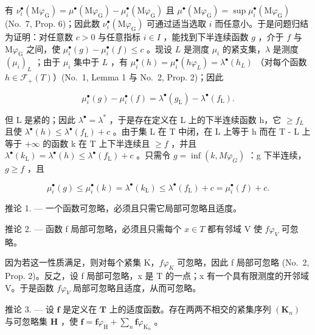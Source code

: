 有 \(\nu_{i}^{\bullet}(\mathrm{M}\varphi_{\mathrm{G}}) = \mu^{\bullet}(\mathrm{M}\varphi_{\mathrm{G}}) - \mu_{i}^{\bullet}(\mathrm{M}\varphi_{\mathrm{G}})\) 且 \(\mu^{\bullet}(\mathrm{M}\varphi_{\mathrm{G}}) = \sup \mu_{i}^{\bullet}(\mathrm{M}\varphi_{\mathrm{G}})\) (No.~7, Prop. 6)；因此数 \(\nu_{i}^{\bullet}(\mathrm{M}\varphi_{\mathrm{G}})\) 可通过适当选取 \(i\) 而任意小。于是问题归结为证明：对任意数 \(c > 0\) 与任意指标 \(i \in I\) ，能找到下半连续函数 \(g\) ，介于 \(f\) 与 \(\mathrm{M}\varphi_{\mathrm{G}}\) 之间，使 \(\mu_{i}^{\bullet}(g) - \mu_{i}^{\bullet}(f) \leqslant c\) 。现设 \(L\) 是测度 \(\mu_{i}\) 的紧支集，\(\lambda\) 是测度 \((\mu_{i})_{L}\) ；由于 \(\mu_{i}\) 集中于 \(L\) ，有 \(\mu_{i}^{\bullet}(h) = \mu_{i}^{\bullet}(h\varphi_{L}) = \lambda^{\bullet}(h_{L})\) （对每个函数 \(h \in \mathcal{F}_{+}(T)\)）(No.~1, Lemma 1 与 No.~2, Prop. 2)；因此

\[
\mu_ {i} ^ {\bullet} (g) - \mu_ {i} ^ {\bullet} (f) = \lambda^ {\bullet} (g _ {\mathrm{L}}) - \lambda^ {\bullet} (f _ {\mathrm{L}}).
\]

但 L 是紧的；因此 \(\lambda^{\bullet} = \lambda^{*}\) ，于是存在定义在 L 上的下半连续函数 h，它 \(\geqslant f_{L}\) 且使 \(\lambda^{\bullet}(h) \leqslant \lambda^{\bullet}(f_{\mathrm{L}}) + c\) 。由于集 L 在 T 中闭，在 L 上等于 h 而在 T - L 上等于 \(+\infty\) 的函数 k 在 T 上下半连续且 \(\geqslant f\) ，并且 \(\lambda^{\bullet}(k_{\mathrm{L}}) = \lambda^{\bullet}(h) \leqslant \lambda^{\bullet}(f_{\mathrm{L}}) + c\) 。只需令 \(g = \inf(k, M\varphi_{G})\) ：g 下半连续，\(g \geqslant f\) ，且

\[
\mu_ {i} ^ {\bullet} (g) \leqslant \mu_ {i} ^ {\bullet} (k) = \lambda^ {\bullet} (k _ {\mathrm{L}}) \leqslant \lambda^ {\bullet} (f _ {\mathrm{L}}) + c = \mu_ {i} ^ {\bullet} (f) + c.
\]

推论 1. --- 一个函数可忽略，必须且只需它局部可忽略且适度。

推论 2. --- 函数 f 局部可忽略，必须且只需每个 \(x \in T\) 都有邻域 V 使 \(f\varphi_{V}\) 可忽略。

因为若这一性质满足，则对每个紧集 K，\(f\varphi_{K}\) 可忽略，因此 f 局部可忽略 (No.~2, Prop. 2)。反之，设 f 局部可忽略，x 是 T 的一点；x 有一个具有限测度的开邻域 V。于是函数 \(f\varphi_{V}\) 局部可忽略且适度，从而可忽略。

推论 3. --- 设 \(\mathbf{f}\) 是定义在 \(\mathbf{T}\) 上的适度函数。存在两两不相交的紧集序列 \((\mathbf{K}_n)\) 与可忽略集 \(\mathbf{H}\) ，使 \(\mathbf{f} = \mathbf{f}\varphi_{\mathrm{H}} + \sum_{n} \mathbf{f}\varphi_{\mathrm{K}_n}\) 。

